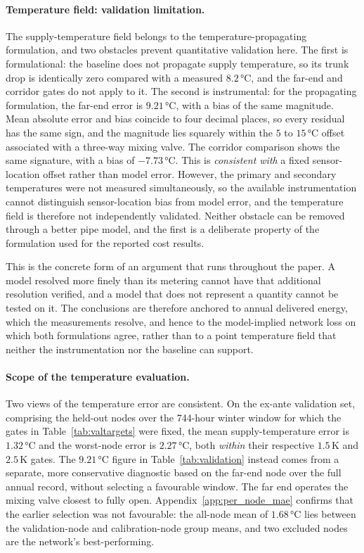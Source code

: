 \documentclass[a4paper,fleqn]{cas-sc}
\begin{document}
\paragraph{Temperature field: validation limitation.}
The supply-temperature field belongs to the temperature-propagating formulation, and two
obstacles prevent quantitative validation here. The first is formulational: the baseline does
not propagate supply temperature, so its trunk drop is identically zero compared with a
measured \(8.2\)\,°C, and the far-end and corridor gates do not apply to it. The second is
instrumental: for the propagating formulation, the far-end error is \(9.21\)\,°C, with a bias
of the same magnitude. Mean absolute error and bias coincide to four decimal places, so every
residual has the same sign, and the magnitude lies squarely within the \(5\) to \(15\)\,°C
offset associated with a three-way mixing valve. The corridor comparison shows the same
signature, with a bias of \(-7.73\)\,°C. This is \emph{consistent with} a fixed sensor-location
offset rather than model error. However, the primary and secondary temperatures were not
measured simultaneously, so the available instrumentation cannot distinguish sensor-location
bias from model error, and the temperature field is therefore not independently validated.
Neither obstacle can be removed through a better pipe model, and the first is a deliberate
property of the formulation used for the reported cost results.

This is the concrete form of an argument that runs throughout the paper. A model resolved more
finely than its metering cannot have that additional resolution verified, and a model that
does not represent a quantity cannot be tested on it. The conclusions are therefore anchored
to annual delivered energy, which the measurements resolve, and hence to the model-implied
network loss on which both formulations agree, rather than to a point temperature field that
neither the instrumentation nor the baseline can support.

\paragraph{Scope of the temperature evaluation.}
Two views of the temperature error are consistent. On the ex-ante validation set, comprising
the held-out nodes over the 744-hour winter window for which the gates in
Table~\ref{tab:valtargets} were fixed, the mean supply-temperature error is \(1.32\)\,°C and
the worst-node error is \(2.27\)\,°C, both \emph{within} their respective \(1.5\)\,K and
\(2.5\)\,K gates. The \(9.21\)\,°C figure in Table~\ref{tab:validation} instead comes from a
separate, more conservative diagnostic based on the far-end node over the full annual record,
without selecting a favourable window. The far end operates the mixing valve closest to fully
open. Appendix~\ref{app:per_node_mae} confirms that the earlier selection was not favourable:
the all-node mean of \(1.68\)\,°C lies between the validation-node and calibration-node group
means, and two excluded nodes are the network's best-performing.
\end{document}
